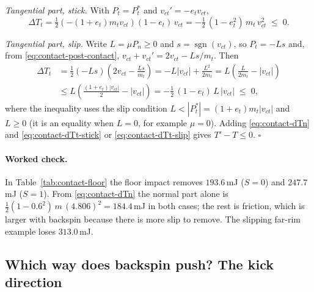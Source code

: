 \emph{Tangential part, stick.} With $P_t=P_t^*$ and $v_{ct}'=-e_tv_{ct}$,
\begin{equation}
  \Delta T_t = \tfrac12\left(-(1+e_t)m_t v_{ct}\right)(1-e_t)\,v_{ct}
  = -\tfrac12\,(1-e_t^2)\,m_t\,v_{ct}^2 \;\le\; 0 .
  \label{eq:contact-dTt-stick}
\end{equation}

\emph{Tangential part, slip.} Write $L=\mu P_n\ge0$ and $s=\operatorname{sgn}(v_{ct})$, so
$P_t=-Ls$ and, from \eqref{eq:contact-post-contact}, $v_{ct}+v_{ct}'=2v_{ct}-Ls/m_t$. Then
\begin{align}
  \Delta T_t &= \tfrac12(-Ls)\left(2v_{ct}-\frac{Ls}{m_t}\right)
  = -L|v_{ct}| + \frac{L^2}{2m_t}
  = L\left(\frac{L}{2m_t}-|v_{ct}|\right) \nonumber\\
  &\le L\left(\frac{(1+e_t)|v_{ct}|}{2}-|v_{ct}|\right)
  = -\tfrac12\,(1-e_t)\,L\,|v_{ct}| \;\le\; 0,
  \label{eq:contact-dTt-slip}
\end{align}
where the inequality uses the slip condition $L<|P_t^*|=(1+e_t)m_t|v_{ct}|$ and $L\ge0$ (it is
an equality when $L=0$, for example $\mu=0$).
Adding \eqref{eq:contact-dTn} and \eqref{eq:contact-dTt-stick} or \eqref{eq:contact-dTt-slip} gives
$T'-T\le0$. \hfill$\square$

\paragraph{Worked check.}
In Table~\ref{tab:contact-floor} the floor impact removes $193.6$\,\unit{mJ}\predicted{} ($S=0$) and
$247.7$\,\unit{mJ}\predicted{} ($S=1$). From \eqref{eq:contact-dTn} the normal part alone is
$\tfrac12(1-0.6^2)\,m\,(4.806)^2=184.4$\,\unit{mJ}\predicted{} in both cases; the rest is
friction, which is larger with backspin because there is more slip to remove. The slipping
far-rim example loses $313.0$\,\unit{mJ}\predicted.

\subsection{Which way does backspin push? The kick direction}
\label{sec:contact-kick}

